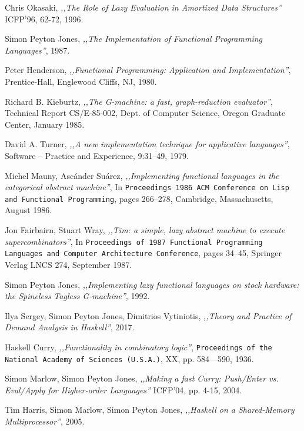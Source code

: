 \documentclass[en]{pracamgr}
\begin{document}
\begin{thebibliography}{99}
 Chris Okasaki, \textit{,,The Role of Lazy Evaluation in Amortized Data Structures''} ICFP'96, 62-72, 1996.

 Simon Peyton Jones, \textit{,,The Implementation of Functional Programming Languages''}, 1987.

 Peter Henderson, \textit{,,Functional Programming: Application and Implementation''},
Prentice-Hall, Englewood Cliffs, NJ, 1980.

 Richard B. Kieburtz, \textit{,,The G-machine: a fast, graph-reduction evaluator''}, Technical Report CS/E-85-002, Dept. of Computer Science, Oregon Graduate Center, January 1985.

 David A. Turner, \textit{,,A new implementation technique for applicative languages''}, Software -- Practice and Experience, 9:31–49, 1979.

 Michel Mauny, Asc\'ander Su\'arez, \textit{,,Implementing functional languages in the categorical abstract machine''}, In \texttt{Proceedings 1986 ACM Conference on Lisp and Functional Programming}, pages 266–278, Cambridge, Massachusetts, August 1986.

 Jon Fairbairn, Stuart Wray, \textit{,,Tim: a simple, lazy abstract machine to execute supercombinators''},  In \texttt{Proceedings of 1987 Functional Programming Languages and Computer Architecture Conference}, pages 34–45, Springer Verlag LNCS 274, September 1987.

 Simon Peyton Jones, \textit{,,Implementing lazy functional languages on stock hardware: the Spineless Tagless G-machine''}, 1992.

 Ilya Sergey, Simon Peyton Jones, Dimitrios Vytiniotis, \textit{,,Theory and Practice of Demand Analysis in Haskell''}, 2017.

 Haskell Curry, \textit{,,Functionality in combinatory logic''}, \texttt{Proceedings
of the National Academy of Sciences (U.S.A.)}, XX, pp. 584—590, 1936.

 Simon Marlow, Simon Peyton Jones, \textit{,,Making a fast Curry: Push/Enter vs. Eval/Apply for Higher-order Languages''} ICFP'04, pp. 4-15, 2004.

 Tim Harris, Simon Marlow, Simon Peyton Jones, \textit{,,Haskell on a Shared-Memory Multiprocessor''}, 2005.

\end{thebibliography}
\end{document}
